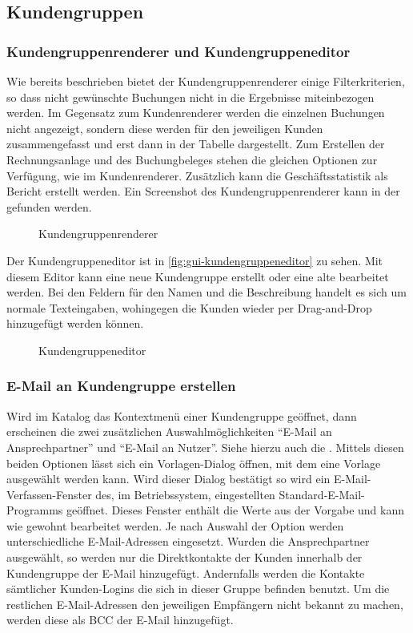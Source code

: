 \subsection{Kundengruppen}

\subsubsection{Kundengruppenrenderer und Kundengruppeneditor}
Wie bereits beschrieben bietet der Kundengruppenrenderer einige Filterkriterien, so dass nicht gewünschte Buchungen nicht in die Ergebnisse miteinbezogen werden.
Im Gegensatz zum Kundenrenderer werden die einzelnen Buchungen nicht angezeigt, sondern diese werden für den jeweiligen Kunden zusammengefasst und erst dann in der Tabelle dargestellt.
Zum Erstellen der Rechnungsanlage und des Buchungbeleges stehen die gleichen Optionen zur Verfügung, wie im Kundenrenderer.
Zusätzlich kann die Geschäftsstatistik als Bericht erstellt werden.
Ein Screenshot des Kundengruppenrenderer kann in der  gefunden werden.
\begin{figure}[htb]
	\centering
	\caption{Kundengruppenrenderer}
	\label{fig:gui-kundengruppenrenderer}
\end{figure}

Der Kundengruppeneditor ist in \autoref{fig:gui-kundengruppeneditor} zu sehen. Mit diesem Editor kann eine neue Kundengruppe erstellt oder eine alte bearbeitet werden. Bei den Feldern für den Namen und die Beschreibung handelt es sich um normale Texteingaben, wohingegen die Kunden wieder per Drag-and-Drop hinzugefügt werden können.

\begin{figure}[htb]
	\centering
	\caption{Kundengruppeneditor}
	\label{fig:gui-kundengruppeneditor}
\end{figure}

\subsubsection{E-Mail an Kundengruppe erstellen}
Wird im Katalog das Kontextmenü einer Kundengruppe geöffnet, dann erscheinen die zwei zusätzlichen Auswahlmöglichkeiten "`E-Mail an Ansprechpartner"' und "`E-Mail an Nutzer"'.
Siehe hierzu auch die .
Mittels diesen beiden Optionen lässt sich ein Vorlagen-Dialog öffnen, mit dem eine Vorlage ausgewählt werden kann.
Wird dieser Dialog bestätigt so wird ein E-Mail-Verfassen-Fenster des, im Betriebssystem, eingestellten Standard-E-Mail-Programms geöffnet.
Dieses Fenster enthält die Werte aus der Vorgabe und kann wie gewohnt bearbeitet werden.
Je nach Auswahl der Option werden unterschiedliche E-Mail-Adressen eingesetzt.
Wurden die Ansprechpartner ausgewählt, so werden nur die Direktkontakte der Kunden innerhalb der Kundengruppe der E-Mail hinzugefügt.
Andernfalls werden die Kontakte sämtlicher Kunden-Logins die sich in dieser Gruppe befinden benutzt.
Um die restlichen E-Mail-Adressen den jeweiligen Empfängern nicht bekannt zu machen, werden diese als BCC der E-Mail hinzugefügt.

